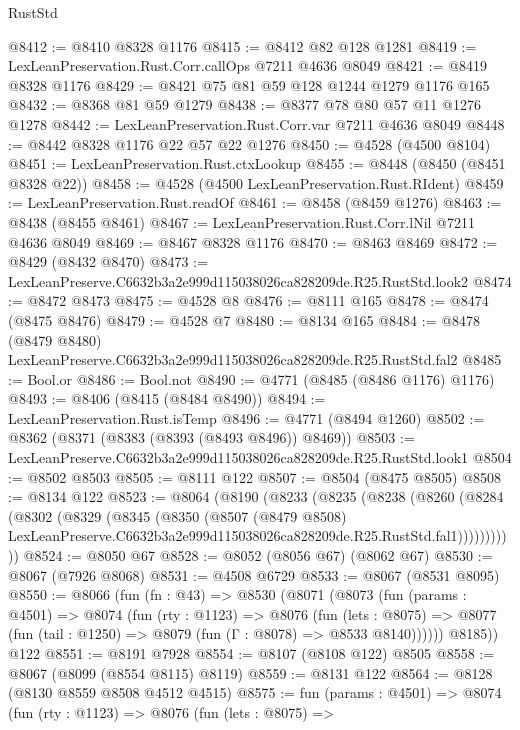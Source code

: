 \begin{lexlean}{RustStd}
\begin{coremodule}
@8412 := @8410 @8328 @1176
@8415 := @8412 @82 @128 @1281
@8419 := LexLeanPreservation.Rust.Corr.callOps @7211 @4636 @8049
@8421 := @8419 @8328 @1176
@8429 := @8421 @75 @81 @59 @128 @1244 @1279 @1176 @165
@8432 := @8368 @81 @59 @1279
@8438 := @8377 @78 @80 @57 @11 @1276 @1278
@8442 := LexLeanPreservation.Rust.Corr.var @7211 @4636 @8049
@8448 := @8442 @8328 @1176 @22 @57 @22 @1276
@8450 := @4528 (@4500 @8104)
@8451 := LexLeanPreservation.Rust.ctxLookup
@8455 := @8448 (@8450 (@8451 @8328 @22))
@8458 := @4528 (@4500 LexLeanPreservation.Rust.RIdent)
@8459 := LexLeanPreservation.Rust.readOf
@8461 := @8458 (@8459 @1276)
@8463 := @8438 (@8455 @8461)
@8467 := LexLeanPreservation.Rust.Corr.lNil @7211 @4636 @8049
@8469 := @8467 @8328 @1176
@8470 := @8463 @8469
@8472 := @8429 (@8432 @8470)
@8473 := LexLeanPreserve.C6632b3a2e999d115038026ca828209de.R25.RustStd.look2
@8474 := @8472 @8473
@8475 := @4528 @8
@8476 := @8111 @165
@8478 := @8474 (@8475 @8476)
@8479 := @4528 @7
@8480 := @8134 @165
@8484 := @8478 (@8479 @8480) LexLeanPreserve.C6632b3a2e999d115038026ca828209de.R25.RustStd.fal2
@8485 := Bool.or
@8486 := Bool.not
@8490 := @4771 (@8485 (@8486 @1176) @1176)
@8493 := @8406 (@8415 (@8484 @8490))
@8494 := LexLeanPreservation.Rust.isTemp
@8496 := @4771 (@8494 @1260)
@8502 := @8362 (@8371 (@8383 (@8393 (@8493 @8496)) @8469))
@8503 := LexLeanPreserve.C6632b3a2e999d115038026ca828209de.R25.RustStd.look1
@8504 := @8502 @8503
@8505 := @8111 @122
@8507 := @8504 (@8475 @8505)
@8508 := @8134 @122
@8523 := @8064
    (@8190
      (@8233
        (@8235
          (@8238
            (@8260
              (@8284
                (@8302
                  (@8329
                    (@8345
                      (@8350
                        (@8507
                          (@8479 @8508)
                          LexLeanPreserve.C6632b3a2e999d115038026ca828209de.R25.RustStd.fal1)))))))))))
@8524 := @8050 @67
@8528 := @8052 (@8056 @67) (@8062 @67)
@8530 := @8067 (@7926 @8068)
@8531 := @4508 @6729
@8533 := @8067 (@8531 @8095)
@8550 := @8066
    (fun (fn : @43) =>
    @8530
      (@8071
        (@8073
          (fun (params : @4501) =>
          @8074
            (fun (rty : @1123) =>
            @8076
              (fun (lets : @8075) =>
              @8077 (fun (tail : @1250) => @8079 (fun (Γ : @8078) => @8533 @8140))))))
        @8185))
    @122
@8551 := @8191 @7928
@8554 := @8107 (@8108 @122) @8505
@8558 := @8067 (@8099 (@8554 @8115) @8119)
@8559 := @8131 @122
@8564 := @8128 (@8130 @8559 @8508 @4512 @4515)
@8575 := fun (params : @4501) =>
  @8074
    (fun (rty : @1123) =>
    @8076
      (fun (lets : @8075) =>

\end{coremodule}
\end{lexlean}
